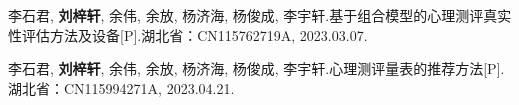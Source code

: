 
\item 李石君, \textbf{刘梓轩}, 余伟, 余放, 杨济海, 杨俊成, 李宇轩.基于组合模型的心理测评真实性评估方法及设备[P].湖北省：CN115762719A, 2023.03.07.
\item 李石君, \textbf{刘梓轩}, 余伟, 余放, 杨济海, 杨俊成, 李宇轩.心理测评量表的推荐方法[P].湖北省：CN115994271A, 2023.04.21.